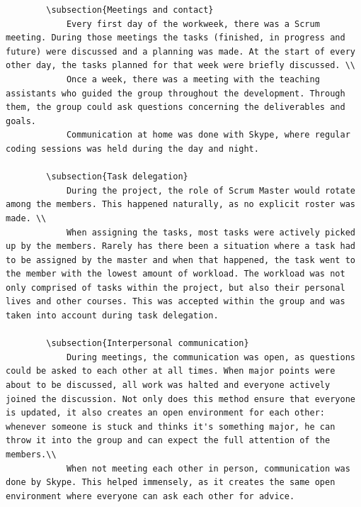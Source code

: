 \documentclass[10pt,a4paper]{report}
\begin{document}
\begin{lstlisting}
		\subsection{Meetings and contact}
			Every first day of the workweek, there was a Scrum meeting. During those meetings the tasks (finished, in progress and future) were discussed and a planning was made. At the start of every other day, the tasks planned for that week were briefly discussed. \\
			Once a week, there was a meeting with the teaching assistants who guided the group throughout the development. Through them, the group could ask questions concerning the deliverables and goals.
			Communication at home was done with Skype, where regular coding sessions was held during the day and night.

		\subsection{Task delegation}
			During the project, the role of Scrum Master would rotate among the members. This happened naturally, as no explicit roster was made. \\
			When assigning the tasks, most tasks were actively picked up by the members. Rarely has there been a situation where a task had to be assigned by the master and when that happened, the task went to the member with the lowest amount of workload. The workload was not only comprised of tasks within the project, but also their personal lives and other courses. This was accepted within the group and was taken into account during task delegation.

		\subsection{Interpersonal communication}
			During meetings, the communication was open, as questions could be asked to each other at all times. When major points were about to be discussed, all work was halted and everyone actively joined the discussion. Not only does this method ensure that everyone is updated, it also creates an open environment for each other: whenever someone is stuck and thinks it's something major, he can throw it into the group and can expect the full attention of the members.\\
			When not meeting each other in person, communication was done by Skype. This helped immensely, as it creates the same open environment where everyone can ask each other for advice.


\end{lstlisting}
\end{document}
